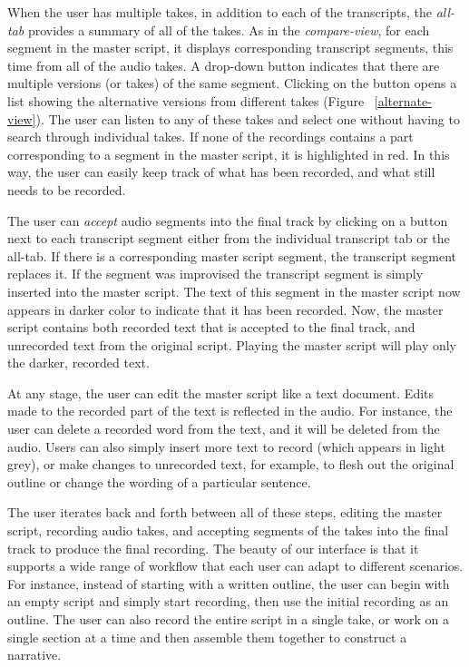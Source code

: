 When the user has multiple takes, in addition to each of the transcripts, the \textit{all-tab} provides a summary of all of the takes. As in the \textit{compare-view}, for each segment in the master script, it displays corresponding transcript segments, this time from all of the audio takes. A drop-down button indicates that there are multiple versions (or takes) of the same segment. Clicking on the button opens a
list showing the alternative versions from different takes (Figure ~\ref{alternate-view}). The user can listen to any of these takes and select one without having to search through individual takes. If none of the recordings contains a part corresponding to a segment in the master script, it is highlighted in red. In this way, the user can easily keep track of what has been recorded, and what still needs to be recorded.  

The user can \textit{accept} audio segments into the final track by clicking on a button next to each transcript segment either from the individual transcript tab or the all-tab. If there is a corresponding master script segment, the transcript segment replaces it. If the segment was improvised the transcript segment is simply inserted into the master script.
The text of this segment in the master script now appears in darker color to indicate that it has been recorded. Now, the master script contains both recorded text that is accepted to the final track, and unrecorded text from the original script.
Playing the master script will play only the darker, recorded text. 

 At any stage, the user can edit the master script like a text document. Edits made to the recorded part of the text is reflected in the audio. For instance, the user can delete a recorded word from the text, and it will be deleted from the audio.  Users can also simply insert more text to record (which appears in light grey), or make changes to unrecorded text, for example, to flesh out the original outline or change the wording of a particular sentence. 

The user iterates back and forth between all of these steps, editing the master script, recording audio takes, and accepting segments of the takes into the final track to produce the final recording.
The beauty of our interface is that it supports a wide range of workflow that each user can adapt to different scenarios. For instance, instead of starting with a written outline, the user can begin with an empty script and simply start recording,  then use  the initial recording as an outline. The user can also record the entire script in a single take, or work on a single section at a time and then assemble them together to construct a narrative.
